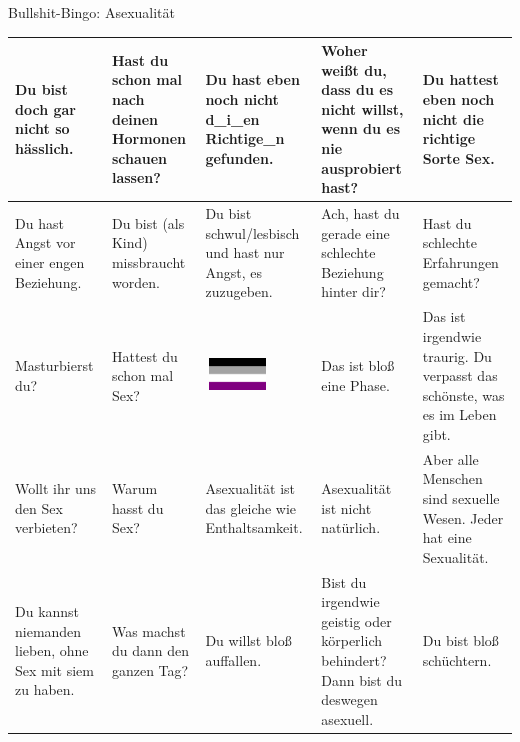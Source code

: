 \documentclass[11pt]{article}
\begin{document}
\thispagestyle{empty}
\begin{center}

\huge{Bullshit-Bingo: Asexualität}\\
\vspace{1cm}
\normalsize

\begin{tabular}{|m{3cm}|m{3cm}|m{3cm}|m{3cm}|m{3cm}|}
\hline
Du bist doch gar nicht so hässlich.&
Hast du schon mal nach deinen Hormonen schauen lassen?&
Du hast eben noch nicht d\_i\_en Richtige\_n gefunden.&
Woher weißt du, dass du es nicht willst, wenn du es nie ausprobiert hast?&
Du hattest eben noch nicht die richtige Sorte Sex.\\
\hline
Du hast Angst vor einer engen Beziehung.&
Du bist (als Kind) missbraucht worden.&
Du bist schwul/lesbisch und hast nur Angst, es zuzugeben.&
Ach, hast du gerade eine schlechte Beziehung hinter dir?&
Hast du schlechte Erfahrungen gemacht?\\
\hline
Masturbierst du?&
Hattest du schon mal Sex?&
\vspace{0cm} \centering \includegraphics[width=64px,height=32px]{asexualitaet.png}&
Das ist bloß eine Phase.&
Das ist irgendwie traurig. Du verpasst das schönste, was es im Leben gibt.\\
\hline
Wollt ihr uns den Sex verbieten?&
Warum hasst du Sex?&
Asexualität ist das gleiche wie Enthaltsamkeit.&
Asexualität ist nicht natürlich.&
Aber alle Menschen sind sexuelle Wesen. Jeder hat eine Sexualität.\\
\hline
Du kannst niemanden lieben, ohne Sex mit siem zu haben.&
Was machst du dann den ganzen Tag?&
Du willst bloß auffallen.&
Bist du irgendwie geistig oder körperlich behindert? Dann bist du deswegen asexuell.&
Du bist bloß schüchtern.\\
\hline
\end{tabular}

\end{center}
\end{document}
